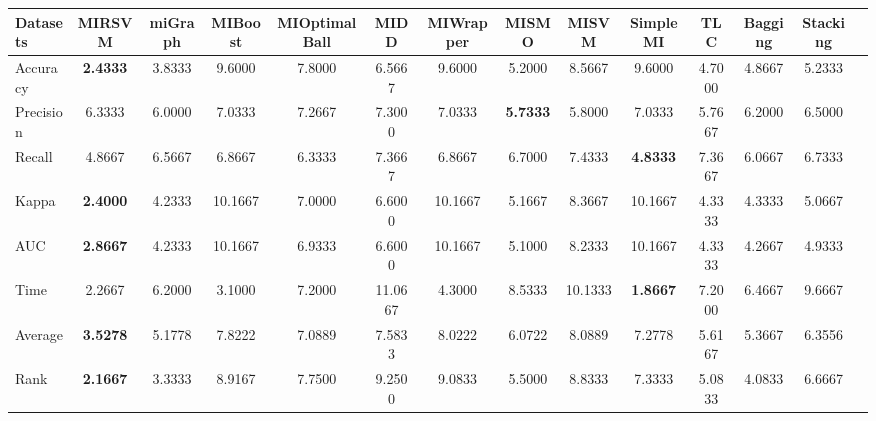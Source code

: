 \begin{threeparttable}
\begin{tabular}{lccccccccccccc}
\toprule
Datasets &MIRSVM &miGraph &MIBoost &MIOptimalBall &MIDD &MIWrapper &MISMO &MISVM &SimpleMI &TLC &Bagging &Stacking \\
\midrule
Accuracy &\textbf{2.4333} &3.8333 &9.6000 &7.8000 &6.5667 &9.6000 &5.2000 &8.5667 &9.6000 &4.7000 &4.8667 &5.2333 &  \\
Precision &6.3333 &6.0000 &7.0333 &7.2667 &7.3000 &7.0333 &\textbf{5.7333} &5.8000 &7.0333 &5.7667 &6.2000 &6.5000 &  \\
Recall &4.8667 &6.5667 &6.8667 &6.3333 &7.3667 &6.8667 &6.7000 &7.4333 &\textbf{4.8333} &7.3667 &6.0667 &6.7333 &  \\
Kappa &\textbf{2.4000} &4.2333 &10.1667 &7.0000 &6.6000 &10.1667 &5.1667 &8.3667 &10.1667 &4.3333 &4.3333 &5.0667 &  \\
AUC &\textbf{2.8667} &4.2333 &10.1667 &6.9333 &6.6000 &10.1667 &5.1000 &8.2333 &10.1667 &4.3333 &4.2667 &4.9333 &  \\
Time &2.2667 &6.2000 &3.1000 &7.2000 &11.0667 &4.3000 &8.5333 &10.1333 &\textbf{1.8667} &7.2000 &6.4667 &9.6667 &  \\
\hline
Average &\textbf{3.5278} &5.1778 &7.8222 &7.0889 &7.5833 &8.0222 &6.0722 &8.0889 &7.2778 &5.6167 &5.3667 &6.3556 &  \\
Rank &\textbf{2.1667} &3.3333 &8.9167 &7.7500 &9.2500 &9.0833 &5.5000 &8.8333 &7.3333 &5.0833 &4.0833 &6.6667 &  \\
\bottomrule
\end{tabular}
\end{threeparttable}